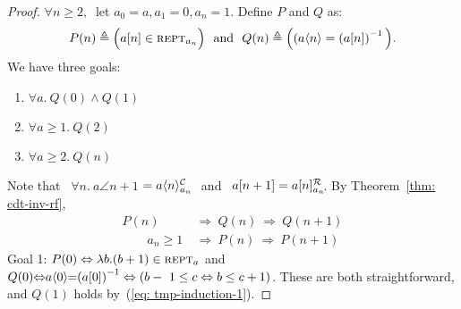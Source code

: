 \begin{proof}
$\forall n \ge 2,~$ let $a_0 = a, a_1 = 0, a_n = 1$. Define $P$ and $Q$ as:
\begin{equation*}
P(n) \triangleq  \Big(a[n] \in \text{\scshape{rept}}_{a_n}\Big)\ \text{ and } \
Q(n) \triangleq  \Big((a\langle n\rangle = \left(a[n]\right)^{-1} \Big).
\end{equation*}
We have three goals:
\begin{enumerate}
	\item $\forall a.~ Q(0) \wedge Q(1)$ \\ \vspace{-1.2em}
	\item $\forall a \ge 1.~ Q(2)$ \\ \vspace{-1.2em}
	\item $\forall a \ge 2.~ Q(n)$ \\ \vspace{-1.2em}
\end{enumerate}
	Note that \ \mbox{$\forall n.~ a\angle{n+1}$} $= \cdt{a\angle{n}}{a_n}$ ~and \ $a[n+1] = \rf{a[n]}{a_n}$. By Theorem~\ref{thm: cdt-inv-rf},
	\begin{align}
	P(n) & \ \Rightarrow \ Q(n) \ \Rightarrow \ Q(n+1) \label{eq: tmp-induction-1} \\
	\qquad a_{n} \ge 1 & \ \Rightarrow \ P(n) \ \Rightarrow \ P(n+1) \label{eq: tmp-induction-2}
	\end{align}
Goal 1: $P(0) \Leftrightarrow \lambda b.(b+1)\in \text{\scshape{rept}}_a$ and
$Q(0)\hspace{-0.3em}\iff\hspace{-0.3em}a\angle{0}\hspace{-0.3em}=\hspace{-0.3em}\left(a[0]\right)^{-1} \lb \iff (b-~1\le c \iff b\le c+1)$.
These are both straightforward, and $Q(1)$ holds by~(\ref{eq: tmp-induction-1}). 

\end{proof}
